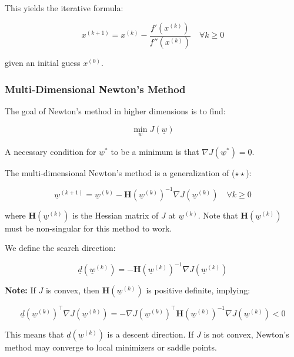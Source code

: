 This yields the iterative formula:

\begin{equation}
    x^{(k+1)} = x^{(k)} - \frac{f'(x^{(k)})}{f''(x^{(k)})} \quad \forall k \geq 0 \tag{$\star\star$}
\end{equation}

given an initial guess $x^{(0)}$.

\subsubsection*{Multi-Dimensional Newton's Method}

The goal of Newton's method in higher dimensions is to find:

\begin{equation}
    \min_{\underline{w}} J(\underline{w})
\end{equation}

A necessary condition for $\underline{w}^*$ to be a minimum is that $\nabla J(\underline{w}^*) = \underline{0}$. 

The multi-dimensional Newton's method is a generalization of ($\star\star$):

\begin{equation}
    \underline{w}^{(k+1)} = \underline{w}^{(k)} - \mathbf{H} (\underline{w}^{(k)})^{-1}\nabla J(\underline{w}^{(k)}) \quad \forall k \geq 0
\end{equation}

where $\mathbf{H} (\underline{w}^{(k)})$ is the Hessian matrix of $J$ at $\underline{w}^{(k)}$. Note that $\mathbf{H} (\underline{w}^{(k)})$ must be non-singular for this method to work.

We define the search direction:

\begin{equation}
    \underline{d}(\underline{w}^{(k)}) = - \mathbf{H} (\underline{w}^{(k)})^{-1}\nabla J(\underline{w}^{(k)})
\end{equation}

\textbf{Note:} If $J$ is convex, then $\mathbf{H} (\underline{w}^{(k)})$ is positive definite, implying:

\begin{equation}
    \underline{d}(\underline{w}^{(k)})^\top \nabla J(\underline{w}^{(k)}) = - \nabla J(\underline{w}^{(k)})^\top \mathbf{H} (\underline{w}^{(k)})^{-1}\nabla J(\underline{w}^{(k)}) < 0
\end{equation}

This means that $\underline{d}(\underline{w}^{(k)})$ is a descent direction. If $J$ is not convex, Newton's method may converge to local minimizers or saddle points.

